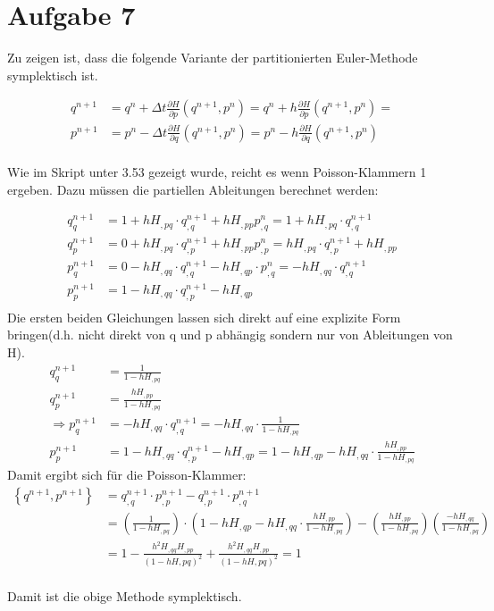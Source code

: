 \documentclass[a4paper,10pt]{article}
\newcommand{\prt}[2]{\frac{\partial #1}{\partial #2}}
\begin{document}
\section{Aufgabe 7}

Zu zeigen ist, dass die folgende Variante der partitionierten Euler-Methode symplektisch ist.

\begin{align*}
 q^{n+1} &= q^n + \Delta t \prt H p \left(q^{n + 1}, p^n \right) = q^n + h \prt H p \left(q^{n + 1}, p^n \right) =  \\
 p^{n+1} &= p^n - \Delta t \prt H q \left(q^{n + 1}, p^n \right) = p^n - h \prt H q \left(q^{n + 1}, p^n \right)\\
\end{align*}

Wie im Skript unter 3.53 gezeigt wurde, reicht es wenn Poisson-Klammern 1 ergeben.
Dazu müssen die partiellen Ableitungen berechnet werden:

\begin{align*}
q^{n+1}_q &= 1 + h H_{,pq} \cdot q^{n+1}_{,q} + h H_{,pp} p^n_{,q} =  1 + h H_{,pq} \cdot q^{n+1}_{,q} \\
q^{n+1}_p &= 0 + h H_{,pq} \cdot q^{n+1}_{,p} + h H_{,pp} p^n_{,p} = h H_{,pq} \cdot q^{n+1}_{,p} + h H_{,pp} \\
p^{n+1}_q &= 0 - h H_{,qq} \cdot q^{n+1}_{,q} - h H_{,qp}  \cdot p^{n}_{,q} = - h H_{,qq}  \cdot q^{n+1}_{,q} \\
p^{n+1}_p &= 1 - h H_{,qq} \cdot q^{n+1}_{,p} - h H_{,qp} \\
\end{align*}
Die ersten beiden Gleichungen lassen sich direkt auf eine explizite Form bringen(d.h. nicht direkt von q und p abhängig sondern nur von Ableitungen von H).
\begin{align*}
q^{n+1}_q &= \frac{1}{1 - h H_{,pq}} \\
q^{n+1}_p &= \frac{h H_{,pp}}{1 - h H_{,pq}} \\
\Rightarrow
p^{n+1}_q &= - h H_{,qq}  \cdot q^{n+1}_{,q} = - h H_{,qq}  \cdot \frac{1}{1 - h H_{,pq}} \\
p^{n+1}_p &= 1 - h H_{,qq} \cdot q^{n+1}_{,p} - h H_{,qp} = 1 - h H_{,qp} - h H_{,qq} \cdot \frac{h H_{,pp}}{1 - h H_{,pq}}
\end{align*}
Damit ergibt sich für die Poisson-Klammer:
\begin{align*}
\left\{
  q^{n+1}, p^{n+1}
\right\} &= q^{n+1}_{,q} \cdot p^{n+1}_{,p} - q^{n+1}_{,p} \cdot p^{n+1}_{,q} \\
&=
\left(\frac{1}{1 - h H_{,pq}}\right) \cdot
\left(1 - h H_{,qp} - h H_{,qq} \cdot \frac{h H_{,pp}}{1 - h H_{,pq}}\right)
-
\left(\frac{h H_{,pp}}{1 - h H_{,pq}}\right)
\left(\frac{- h H_{,qq}}{1 - h H_{,pq}} \right) \\
&= 1 - \frac{h^2 H_{,qq} H_{,pp}}{(1- h H{,pq})^2}
+ \frac{h^2 H_{,qq} H_{,pp}}{(1- h H{,pq})^2} = 1 \\
\end{align*}

Damit ist die obige Methode symplektisch.
\end{document}
